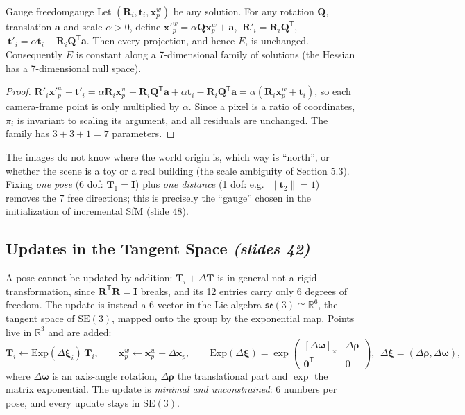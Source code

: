 \documentclass[11pt,a4paper]{article}
\newcommand{\slr}[1]{\texorpdfstring{\emph{(slides #1)}}{(slides #1)}}
\newcommand{\R}{\mathbb{R}}
\newcommand{\SE}{\mathrm{SE}(3)}
\newcommand{\se}{\mathfrak{se}(3)}
\newcommand{\sk}[1]{[#1]_{\times}}
\newcommand{\norm}[1]{\lVert #1\rVert}
\newcommand{\tr}{^{\mathsf T}}
\begin{document}
\begin{proposition}{Gauge freedom}{gauge}
Let $(\bm R_i,\bm t_i,\bm x^w_p)$ be any solution. For any rotation $\bm Q$, translation $\bm a$ and scale $\alpha>0$, define
$\bm x'^w_p=\alpha\bm Q\bm x^w_p+\bm a$, $\ \bm R'_i=\bm R_i\bm Q\tr$, $\ \bm t'_i=\alpha\bm t_i-\bm R_i\bm Q\tr\bm a$.
Then every projection, and hence $E$, is unchanged. Consequently $E$ is constant along a 7-dimensional family of solutions (the Hessian has a 7-dimensional null space).
\end{proposition}
\begin{proof}
$\bm R'_i\bm x'^w_p+\bm t'_i=\alpha\bm R_i\bm x^w_p+\bm R_i\bm Q\tr\bm a+\alpha\bm t_i-\bm R_i\bm Q\tr\bm a=\alpha(\bm R_i\bm x^w_p+\bm t_i)$,
so each camera-frame point is only multiplied by $\alpha$. Since a pixel is a ratio of coordinates, $\pi_i$ is invariant to scaling its argument, and all residuals are unchanged. The family has $3+3+1=7$ parameters.
\end{proof}

\begin{intuition}
The images do not know where the world origin is, which way is ``north'', or whether the scene is a toy or a real building (the scale ambiguity of Section 5.3). Fixing \emph{one pose} ($6$ dof: $\bm T_1=\bm I$) plus \emph{one distance} (1 dof: e.g.\ $\norm{\bm t_2}=1$) removes the 7 free directions; this is precisely the ``gauge'' chosen in the initialization of incremental SfM (slide 48).
\end{intuition}

\subsection{Updates in the Tangent Space \slr{42}}
A pose cannot be updated by addition: $\bm T_i+\Delta\bm T$ is in general not a rigid transformation, since $\bm R\tr\bm R=\bm I$ breaks, and its 12 entries carry only 6 degrees of freedom. The update is instead a 6-vector in the Lie algebra $\se\cong\R^6$, the tangent space of $\SE$, mapped onto the group by the exponential map. Points live in $\R^3$ and are added:
\[
\bm T_i\leftarrow\mathrm{Exp}(\Delta\bm\xi_i)\,\bm T_i,\qquad \bm x^w_p\leftarrow\bm x^w_p+\Delta\bm x_p,\qquad
\mathrm{Exp}(\Delta\bm\xi)=\exp\begin{pmatrix}\sk{\Delta\bm\omega}&\Delta\bm\rho\\\bm 0\tr&0\end{pmatrix},\ \ \Delta\bm\xi=(\Delta\bm\rho,\Delta\bm\omega),
\]
where $\Delta\bm\omega$ is an axis-angle rotation, $\Delta\bm\rho$ the translational part and $\exp$ the matrix exponential. The update is \emph{minimal and unconstrained}: 6 numbers per pose, and every update stays in $\SE$.
\end{document}
